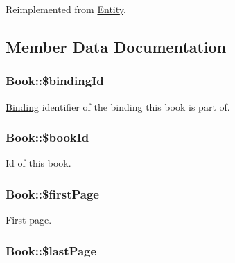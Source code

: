 Reimplemented from \hyperlink{classEntity_a48cdc3830bf695078a69a56f23e1b874}{Entity}.



\subsection{Member Data Documentation}
\hypertarget{classBook_a87186d8e5f7671f3735032047c9ab5ef}{
\subsubsection[{\$bindingId}]{\setlength{\rightskip}{0pt plus 5cm}Book::\$bindingId}}
\label{classBook_a87186d8e5f7671f3735032047c9ab5ef}
\hyperlink{classBinding}{Binding} identifier of the binding this book is part of. \hypertarget{classBook_a6ba400609a6bce5ffd6dd2cf4f52de89}{
\subsubsection[{\$bookId}]{\setlength{\rightskip}{0pt plus 5cm}Book::\$bookId}}
\label{classBook_a6ba400609a6bce5ffd6dd2cf4f52de89}
Id of this book. \hypertarget{classBook_a387848127a960472ad77a28e965eb688}{
\subsubsection[{\$firstPage}]{\setlength{\rightskip}{0pt plus 5cm}Book::\$firstPage}}
\label{classBook_a387848127a960472ad77a28e965eb688}
First page. \hypertarget{classBook_a459f6ea8d3000089d048fad6c4bba961}{
\subsubsection[{\$lastPage}]{\setlength{\rightskip}{0pt plus 5cm}Book::\$lastPage}}
\label{classBook_a459f6ea8d3000089d048fad6c4bba961}
